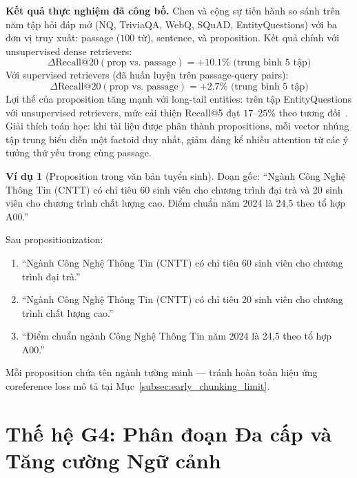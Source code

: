 \documentclass[12pt,a4paper]{report}
\theoremstyle{plain}
\theoremstyle{definition}
\newtheorem{vidu}{Ví dụ}[chapter]
\begin{document}
	\textbf{Kết quả thực nghiệm đã công bố.} Chen và cộng sự tiến hành so sánh
	trên năm tập hỏi đáp mở (NQ, TriviaQA, WebQ, SQuAD, EntityQuestions) với
	ba đơn vị truy xuất: passage ($100$ từ), sentence, và proposition. Kết quả
	chính với unsupervised dense retrievers:
	\begin{equation}
		\Delta \text{Recall}@20(\text{prop vs.\ passage}) = +10.1\%
		\text{ (trung bình 5 tập)}
		\label{eq:prop_recall20}
	\end{equation}
	Với supervised retrievers (đã huấn luyện trên passage-query pairs):
	\begin{equation}
		\Delta \text{Recall}@20(\text{prop vs.\ passage}) = +2.7\%
		\text{ (trung bình 5 tập)}
		\label{eq:prop_recall20_sup}
	\end{equation}
	Lợi thế của proposition tăng mạnh với long-tail entities: trên tập
	EntityQuestions với unsupervised retrievers, mức cải thiện Recall@5 đạt
	$17$--$25\%$ theo tương đối~\cite{chen2024dense}. Giải thích toán học:
	khi tài liệu được phân thành propositions, mỗi vector nhúng tập trung biểu
	diễn một factoid duy nhất, giảm đáng kể nhiễu attention từ các ý tưởng
	thứ yếu trong cùng passage.
	
	\begin{vidu}[Proposition trong văn bản tuyển sinh]
		Đoạn gốc: ``Ngành Công Nghệ Thông Tin (CNTT) có chỉ tiêu 60 sinh viên cho
		chương trình đại trà và 20 sinh viên cho chương trình chất lượng cao. Điểm
		chuẩn năm 2024 là 24,5 theo tổ hợp A00.''
		
		Sau propositionization:
		\begin{enumerate}
			\item ``Ngành Công Nghệ Thông Tin (CNTT) có chỉ tiêu 60 sinh viên
			cho chương trình đại trà.''
			\item ``Ngành Công Nghệ Thông Tin (CNTT) có chỉ tiêu 20 sinh viên
			cho chương trình chất lượng cao.''
			\item ``Điểm chuẩn ngành Công Nghệ Thông Tin năm 2024 là 24,5 theo
			tổ hợp A00.''
		\end{enumerate}
		Mỗi proposition chứa tên ngành tường minh --- tránh hoàn toàn hiệu ứng
		coreference loss mô tả tại Mục~\ref{subsec:early_chunking_limit}.
	\end{vidu}
	
	\section{Thế hệ G4: Phân đoạn Đa cấp và Tăng cường Ngữ cảnh}
	\label{sec:g4}
	
\end{document}
